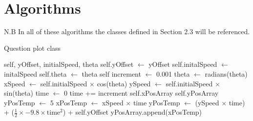 \section{Algorithms}
N.B In all of these algorithms the classes defined in Section 2.3 will be referenced.
\iffalse\begin{algorithm}[h]
	\caption{Question plot class}
	\begin{algorithmic}
		 {}
			 {self, yOffset, initialSpeed, theta}
				\State self.yOffset $\gets$ yOffset
				\State self.initalSpeed $\gets$ initalSpeed
				\State self.theta $\gets$ theta
			\EndFunction
			 {self}
				\State increment $\gets$ 0.001
				\State theta $\gets$ radians(theta)
				\State xSpeed $\gets$ self.initialSpeed $\times$ cos(theta)
				\State ySpeed $\gets$ self.initialSpeed $\times$ sin(theta)
				\State time $\gets$ 0
				\State time += increment
				\State self.xPosArray
				\State self.yPosArray
				\State yPosTemp $\gets$ 5
					\State xPosTemp $\gets$ xSpeed $\times$ time
					\State yPosTemp $\gets$ (ySpeed $\times$ time) + ($\frac{1}{2} \times -9.8 \times \text{time}^2$) + self.yOffset
					\State yPosArray.append(xPosTemp)
				\EndWhile
			\EndFunction
		\EndProcedure
	\end{algorithmic}
\end{algorithm}

